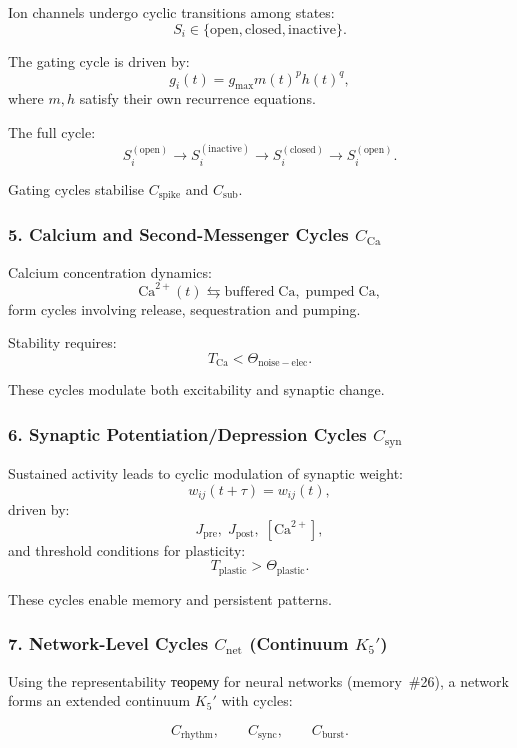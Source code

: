 Ion channels undergo cyclic transitions among states:
\[
  S_i \in \{\mathrm{open}, \mathrm{closed}, \mathrm{inactive}\}.
\]

The gating cycle is driven by:
\[
  g_i(t) = g_{\mathrm{max}} m(t)^p h(t)^q,
\]
where $m,h$ satisfy their own recurrence equations.

The full cycle:
\[
  S_i^{(\mathrm{open})}
  \to 
  S_i^{(\mathrm{inactive})}
  \to
  S_i^{(\mathrm{closed})}
  \to
  S_i^{(\mathrm{open})}.
\]

Gating cycles stabilise $C_{\mathrm{spike}}$ and $C_{\mathrm{sub}}$.

\subsubsection{5. Calcium and Second-Messenger Cycles $C_{\mathrm{Ca}}$}

Calcium concentration dynamics:
\[
  \mathrm{Ca}^{2+}(t)
  \leftrightarrows
  \mathrm{buffered\; Ca},\;
  \mathrm{pumped\; Ca},
\]
form cycles involving release, sequestration and pumping.

Stability requires:
\[
  T_{\mathrm{Ca}} < \Theta_{\mathrm{noise-elec}}.
\]

These cycles modulate both excitability and synaptic change.

\subsubsection{6. Synaptic Potentiation/Depression Cycles $C_{\mathrm{syn}}$}

Sustained activity leads to cyclic modulation of synaptic weight:
\[
  w_{ij}(t+\tau) = w_{ij}(t),
\]
driven by:
\[
  J_{\mathrm{pre}},\; J_{\mathrm{post}},\; [\mathrm{Ca}^{2+}],
\]
and threshold conditions for plasticity:
\[
  T_{\mathrm{plastic}} > \Theta_{\mathrm{plastic}}.
\]

These cycles enable memory and persistent patterns.

\subsubsection{7. Network-Level Cycles $C_{\mathrm{net}}$ (Continuum $K_5'$)}

Using the representability теорему for neural networks (memory~\#26),
a network forms an extended continuum $K_5'$ with cycles:

\[
  C_{\mathrm{rhythm}},
  \qquad
  C_{\mathrm{sync}},
  \qquad
  C_{\mathrm{burst}}.
\]

